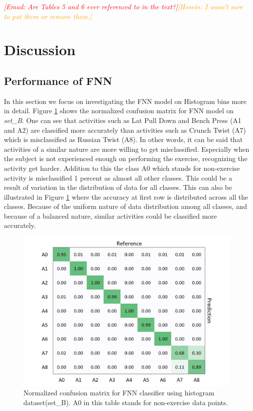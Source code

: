\documentclass[journal,article,submit,moreauthors,pdftex]{Definitions/mdpi}
\newcommand{\emad}[1]{\textcolor{red}{{\it [Emad: #1]}}}
\newcommand{\hosein}[1]{\textcolor{orange}{{\it [Hosein: #1]}}}
\begin{document}
\emad{Are Tables 5 and 6 ever referenced to in the text?}\hosein{I wasn't sure to put them or remove them.}

\section{Discussion}
\subsection{Performance of FNN}
In this section we focus on investigating the FNN model on Histogram bins more in detail. 
Figure \ref{fig:fnn_hbins_confusion_matrix} shows the normalized confusion matrix for FNN model on \textit{set\_B}. One can see that activities such as Lat Pull Down and Bench Press (A1 and A2) are classified more accurately than activities such as Crunch Twist (A7) which is misclassified as Russian Twist (A8). In other words, it can be said that activities of a similar nature are more willing to get misclassified. Especially when the subject is not experienced enough on performing the exercise, recognizing the activity get harder. Addition to this the class A0 which stands for non-exercise activity is misclassified 1 percent as almost all other classes. This could be a result of variation in the distribution of data for all classes. This can also be illustrated in Figure \ref{fig:fnn_hbins_confusion_matrix} where the accuracy at first row is distributed across all the classes. Because of the uniform nature of data distribution among all classes, and because of a balanced nature, similar activities could be classified more accurately.\\
\begin{figure}[H]
	\centering
	\includegraphics[width=7 cm]{Definitions/images/fnn_histogram_set.jpg}
	\caption{Normalized confusion matrix for FNN classifier using histogram dataset(set\_B). A0 in this table stands for non-exercise data points.}
	\label{fig:fnn_hbins_confusion_matrix}
\end{figure} 
\end{document}
